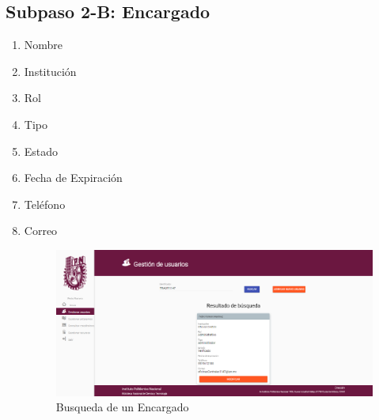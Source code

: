 \subsection{Subpaso 2-B: Encargado}
\begin{enumerate}
	\item Nombre
	\item Institución
	\item Rol
	\item Tipo
	\item Estado
	\item Fecha de Expiración
	\item Teléfono
	\item Correo
	\begin{figure}[hbtp]
		
		\includegraphics[scale=0.3]{images/Interfaz/IUGS22_BusquedaEncargado.png}
		\caption{Busqueda de un Encargado}
	\end{figure}
\end{enumerate}
